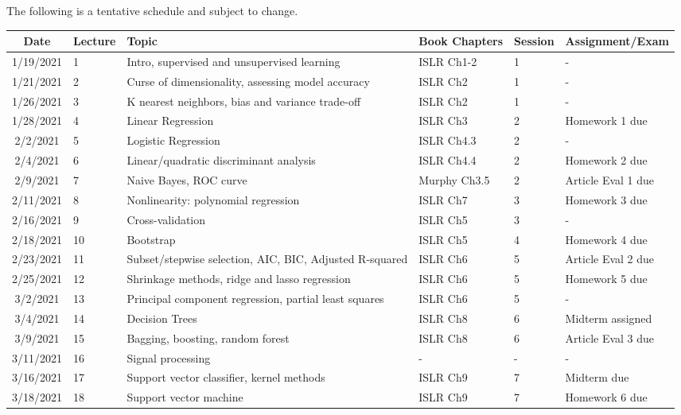 \documentclass[11pt]{article}
\begin{document}
The following is a tentative schedule and subject to change.
\begin{center}
\begin{tabular}{c|m{3em}|m{21em}|m{7em}|m{3em}|m{8em}}
Date & Lecture & Topic & Book Chapters & Session & Assignment/Exam\\
\hline
1/19/2021 & 1 & Intro, supervised and unsupervised learning & ISLR Ch1-2 &  1 & - \\ \hline
1/21/2021 & 2 & Curse of dimensionality, assessing model accuracy & ISLR Ch2 &  1 & - \\ \hline
1/26/2021 & 3 & K nearest neighbors, bias and variance trade-off  & ISLR Ch2 &  1 & - \\ \hline
1/28/2021 & 4 & Linear Regression & ISLR Ch3 &  2 & Homework 1 due \\ \hline
2/2/2021 & 5 & Logistic Regression & ISLR Ch4.3 &  2 & - \\ \hline
2/4/2021 & 6 & Linear/quadratic discriminant analysis & ISLR Ch4.4 &  2 & Homework 2 due \\ \hline
2/9/2021 & 7 & Naive Bayes, ROC curve & Murphy Ch3.5 &  2 & Article Eval 1 due \\ \hline
2/11/2021 & 8 & Nonlinearity: polynomial regression & ISLR Ch7 & 3 & Homework 3 due \\ \hline
2/16/2021 & 9 & Cross-validation & ISLR Ch5 &  3 & -\\ \hline
2/18/2021 & 10 & Bootstrap & ISLR Ch5 &  4 & Homework 4 due \\ \hline
2/23/2021 & 11 &  Subset/stepwise selection, AIC, BIC, Adjusted R-squared & ISLR Ch6 &  5 & Article Eval 2 due \\ \hline
2/25/2021 & 12 & Shrinkage methods, ridge and lasso regression & ISLR Ch6 & 5 & Homework 5 due \\ \hline
3/2/2021 & 13 & Principal component regression, partial least squares & ISLR Ch6 & 5 & -\\ \hline
3/4/2021 & 14 & Decision Trees & ISLR Ch8 & 6 & Midterm assigned \\ \hline
3/9/2021 & 15 & Bagging, boosting, random forest & ISLR Ch8 & 6 & Article Eval 3 due \\ \hline
3/11/2021 & 16 & Signal processing & - & - & - \\ \hline
3/16/2021 & 17 & Support vector classifier, kernel methods & ISLR Ch9 & 7 & Midterm due \\ \hline
3/18/2021 & 18 & Support vector machine & ISLR Ch9 &  7 & Homework 6 due\\ \hline

\end{tabular}
\end{center}
\end{document}
